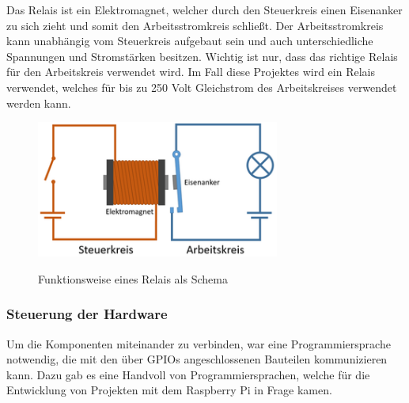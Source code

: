 Das Relais ist ein Elektromagnet, welcher durch den Steuerkreis einen Eisenanker zu sich zieht und somit den Arbeitsstromkreis schließt. Der Arbeitsstromkreis kann unabhängig vom Steuerkreis aufgebaut sein und auch unterschiedliche Spannungen und Stromstärken besitzen. Wichtig ist nur, dass das richtige Relais für den Arbeitskreis verwendet wird. Im Fall diese Projektes wird ein Relais verwendet, welches für bis zu 250 Volt Gleichstrom des Arbeitskreises verwendet werden kann.
\cite{Relais}
\begin{figure}[H]
  \centering
  \includegraphics[width=8cm]{pics/Relais.png}
  \caption{Funktionsweise eines Relais als Schema}
  \cite{RelaisBild}
\end{figure}


\subsubsection{Steuerung der Hardware}
Um die Komponenten miteinander zu verbinden, war eine Programmiersprache notwendig, die mit den über GPIOs angeschlossenen Bauteilen kommunizieren kann. Dazu gab es eine Handvoll von Programmiersprachen, welche für die Entwicklung von Projekten mit dem Raspberry Pi in Frage kamen.

